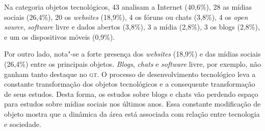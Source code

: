 {Na categoria objetos tecnológicos, 43 analisam a Internet (40,6\%), 28 as mídias sociais (26,4\%), 20 os \textit{websites} (18,9\%), 4 os fóruns ou chats (3,8\%), 4 os \textit{open source}, \textit{software} livre e dados abertos (3,8\%), 3 a mídia (2,8\%), 3 os blogs (2,8\%), e um os dispositivos móveis (0,9\%).

Por outro lado, nota"-se a forte presença dos \textit{websites} (18,9\%) e das
mídias sociais (26,4\%) entre os principais objetos. \textit{Blogs},
\textit{chats} e \textit{software} livre, por exemplo, não ganham tanto
destaque no \textsc{gt}. O processo de desenvolvimento tecnológico leva a
constante transformação dos objetos tecnológicos e a consequente
transformação de seus estudos. Desta forma, os estudos sobre blogs e
chats vão perdendo espaço para estudos sobre mídias sociais nos últimos
anos. Essa constante modificação de objeto mostra que a dinâmica da área
está associada com relação entre tecnologia e sociedade.

}
